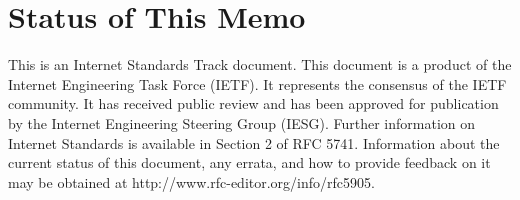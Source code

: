 \section*{Status of This Memo}

This is an Internet Standards Track document.
This document is a product of the Internet Engineering Task Force
(IETF). It represents the consensus of the IETF community. It has
received public review and has been approved for publication by the
Internet Engineering Steering Group (IESG). Further information on
Internet Standards is available in Section 2 of RFC 5741.
Information about the current status of this document, any errata,
and how to provide feedback on it may be obtained at
http://www.rfc-editor.org/info/rfc5905.
